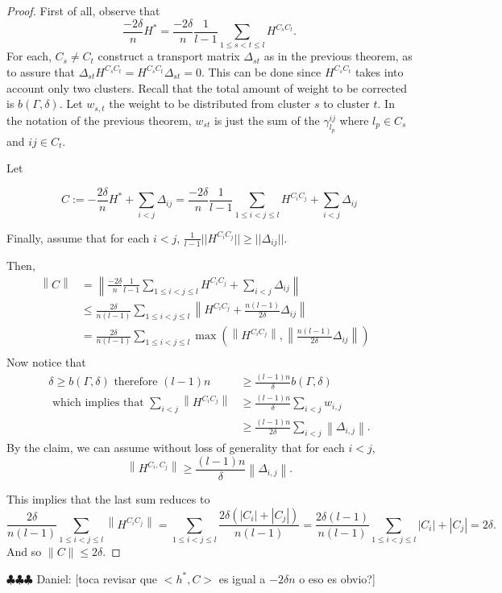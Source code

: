 \documentclass[12pt]{amsart}
\theoremstyle{remark}
\newcommand{\ddr}[1]{{\color{blue} \sf $\clubsuit\clubsuit\clubsuit$ Daniel: [#1]}}
\begin{document}
\begin{proof}

First of all, observe that
\[
\frac{-2\delta}{n}H^* = \frac{-2\delta}{n}\frac{1}{l-1}\sum_{1\leq s<t\leq l}H^{C_sC_t}.
\]
For each, $C_s\neq C_t$ construct a transport matrix $\Delta_{st}$ as in the previous theorem, as to assure that $\Delta_{st}H^{C_sC_t} = H^{C_sC_t} \Delta_{st}=0$. This can be done since $H^{C_sC_t}$ takes into account only two clusters. Recall that the total amount of weight to be corrected is $b(\Gamma,\delta)$. Let $w_{s,t}$ the weight to be distributed from cluster $s$ to cluster $t$. In the notation of the previous theorem, $w_{st}$ is just the sum of the 
$\gamma_{l_p}^{ij}$ where $l_p\in C_s $ and $ij \in C_t $.


Let 

\[
C:= -\frac{2\delta}{n}H^* + \sum_{i<j}\Delta_{ij} = \frac{-2\delta}{n}\frac{1}{l-1}\sum_{1\leq i<j\leq l}H^{C_iC_j} + \sum_{i<j}\Delta_{ij}
\]

Finally, assume that for each $i<j$, $\frac{1}{l-1}||H^{C_iC_j}||\geq ||\Delta_{ij}||$.

Then,
\[
\begin{aligned}
\left\|C\right \| & = \left\| \frac{-2\delta}{n}\frac{1}{l-1}\sum_{1\leq i<j\leq l}H^{C_iC_j} + \sum_{i<j}\Delta_{ij}  \right \|  \\ & \leq \frac{2\delta}{n(l-1)}\sum_{1\leq i<j\leq l}\left \|H^{C_iC_j}+ \frac{n(l-1)}{2\delta} \Delta_{ij}\right \|  \\
& = \frac{2\delta}{n(l-1)}\sum_{1\leq i<j\leq l} \max (\left\|H^{C_iC_j}\right\|,\left\|\frac{n(l-1)}{2\delta}\Delta_{ij}\right\|)& \\
\end{aligned}
\]
Now notice that 
\[
\begin{aligned}
\delta \geq b(\Gamma,\delta) \text{ therefore } (l-1)n & \geq \frac{(l-1)n}{\delta} b(\Gamma,\delta) \\\text{ which implies that }  \sum_{i<j}\left \|H^{C_iC_j}\right \|  & \geq  \frac{(l-1)n}{\delta}\sum_{i<j}w_{i,j}   \\
 & \geq \frac{(l-1)n}{2\delta}\sum_{i<j}\left \|\Delta_{i,j} \right \|  .
\end{aligned}
\]
By the claim, we can assume without loss of generality that
for each $i<j$,
\[
\left \|H^{C_i,C_j}\right \| \geq  \frac{(l-1)n}{\delta}\left \|\Delta_{i,j} \right \|.
\]

This implies that the last sum reduces to
\[
\frac{2\delta}{n(l-1)}\sum_{1\leq i<j\leq l} \left\|H^{C_iC_j}\right\| = \sum_{1\leq i<j\leq l} \frac{2\delta(|C_i|+|C_j|)}{n(l-1)} = \frac{2\delta(l-1)}{n(l-1)}\sum_{1\leq i<j\leq l}|C_i|+|C_j|=2\delta.
\]
And so
$\|C\| \leq 2\delta$.

\end{proof}
\ddr{toca revisar que $<h^*,C>$ es igual a $-2\delta n$ o eso es obvio?}
\end{document}
